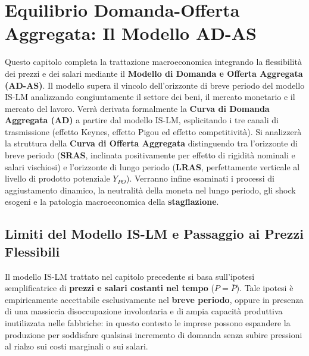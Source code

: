 \chapter{Equilibrio Domanda-Offerta Aggregata: Il Modello AD-AS}
\label{chap:equilibrio_domanda_offerta_aggregata}

\begin{tcolorbox}[colback=navyblue!5!white, colframe=navyblue, title=\textbf{Quadro Concettuale del Capitolo}]
Questo capitolo completa la trattazione macroeconomica integrando la flessibilità dei prezzi e dei salari mediante il \textbf{Modello di Domanda e Offerta Aggregata (AD-AS)}. Il modello supera il vincolo dell'orizzonte di breve periodo del modello IS-LM analizzando congiuntamente il settore dei beni, il mercato monetario e il mercato del lavoro. Verrà derivata formalmente la \textbf{Curva di Domanda Aggregata (AD)} a partire dal modello IS-LM, esplicitando i tre canali di trasmissione (effetto Keynes, effetto Pigou ed effetto competitività). Si analizzerà la struttura della \textbf{Curva di Offerta Aggregata} distinguendo tra l'orizzonte di breve periodo (\textbf{SRAS}, inclinata positivamente per effetto di rigidità nominali e salari vischiosi) e l'orizzonte di lungo periodo (\textbf{LRAS}, perfettamente verticale al livello di prodotto potenziale $Y_{PO}$). Verranno infine esaminati i processi di aggiustamento dinamico, la neutralità della moneta nel lungo periodo, gli shock esogeni e la patologia macroeconomica della \textbf{stagflazione}.
\end{tcolorbox}

\section{Limiti del Modello IS-LM e Passaggio ai Prezzi Flessibili}

Il modello IS-LM trattato nel capitolo precedente si basa sull'ipotesi semplificatrice di \textbf{prezzi e salari costanti nel tempo} ($P = \bar{P}$). Tale ipotesi è empiricamente accettabile esclusivamente nel \textbf{breve periodo}, oppure in presenza di una massiccia disoccupazione involontaria e di ampia capacità produttiva inutilizzata nelle fabbriche: in questo contesto le imprese possono espandere la produzione per soddisfare qualsiasi incremento di domanda senza subire pressioni al rialzo sui costi marginali o sui salari.

